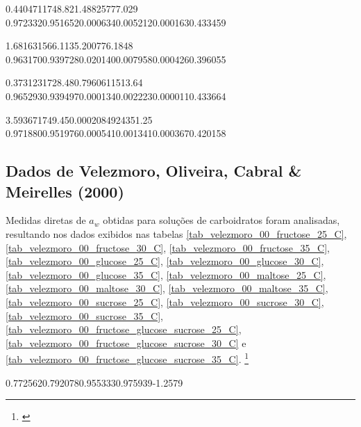 %
	{0.440471}{1748.82}{1.48825}{777.029}
%
	{0.972332}{0.951652}{0.000634}{0.005212}{0.000163}{0.433459}

%
	{1.68163}{1566.11}{35.2007}{76.1848}
%
	{0.963170}{0.939728}{0.020140}{0.007958}{0.000426}{0.396055}

%
	{0.373123}{1728.48}{0.796061}{1513.64}
%
	{0.965293}{0.939497}{0.000134}{0.002223}{0.000011}{0.433664}

%
	{3.59367}{1749.45}{0.000208492}{4351.25}
%
	{0.971880}{0.951976}{0.000541}{0.001341}{0.000367}{0.420158}

\FloatBarrier

\subsection{Dados de Velezmoro, Oliveira, Cabral \& Meirelles (2000)}

Medidas diretas de $a_w$ obtidas para soluções de carboidratos foram analisadas,
resultando nos dados exibidos nas tabelas \ref{tab_velezmoro_00_fructose_25_C},
\ref{tab_velezmoro_00_fructose_30_C}, \ref{tab_velezmoro_00_fructose_35_C},
\ref{tab_velezmoro_00_glucose_25_C}, \ref{tab_velezmoro_00_glucose_30_C},
\ref{tab_velezmoro_00_glucose_35_C}, \ref{tab_velezmoro_00_maltose_25_C},
\ref{tab_velezmoro_00_maltose_30_C}, \ref{tab_velezmoro_00_maltose_35_C},
\ref{tab_velezmoro_00_sucrose_25_C}, \ref{tab_velezmoro_00_sucrose_30_C},
\ref{tab_velezmoro_00_sucrose_35_C},
\ref{tab_velezmoro_00_fructose_glucose_sucrose_25_C},
\ref{tab_velezmoro_00_fructose_glucose_sucrose_30_C} e
\ref{tab_velezmoro_00_fructose_glucose_sucrose_35_C}.
\footnote{\cite{velezmoro2000}}


%
	{0.772562}{0.792078}{0.955333}{0.975939}{-1.2579}

